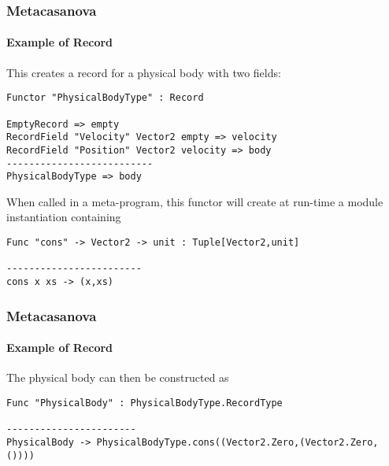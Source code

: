 \documentclass[10pt,a4paper]{beamer}
\begin{document}
\begin{frame}[fragile]
\frametitle{Metacasanova}
\framesubtitle{Example of Record}

This creates a record for a physical body with two fields:

\begin{lstlisting}
Functor "PhysicalBodyType" : Record

EmptyRecord => empty
RecordField "Velocity" Vector2 empty => velocity
RecordField "Position" Vector2 velocity => body
--------------------------
PhysicalBodyType => body
\end{lstlisting}

When called in a meta-program, this functor will create at run-time a module instantiation containing

\begin{lstlisting}
Func "cons" -> Vector2 -> unit : Tuple[Vector2,unit]

------------------------
cons x xs -> (x,xs)
\end{lstlisting}
\end{frame}

\begin{frame}[fragile]
\frametitle{Metacasanova}
\framesubtitle{Example of Record}

The physical body can then be constructed as

\begin{lstlisting}
Func "PhysicalBody" : PhysicalBodyType.RecordType

-----------------------
PhysicalBody -> PhysicalBodyType.cons((Vector2.Zero,(Vector2.Zero,())))
\end{lstlisting}
\end{frame}
\end{document}
